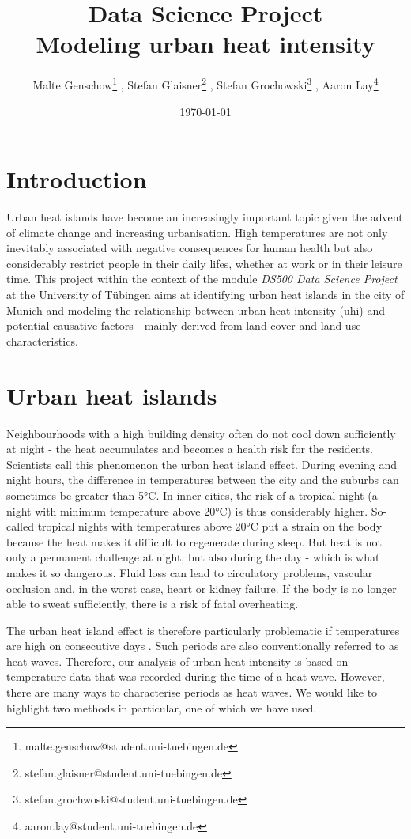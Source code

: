 \documentclass[12pt]{article}
\title{\vspace{-2cm} Data Science Project \\ Modeling urban heat intensity}
\author{Malte Genschow\thanks{malte.genschow@student.uni-tuebingen.de} , Stefan Glaisner\thanks{stefan.glaisner@student.uni-tuebingen.de} , Stefan Grochowski\thanks{stefan.grochwoski@student.uni-tuebingen.de} , Aaron Lay\thanks{aaron.lay@student.uni-tuebingen.de}}
\date{\today}
\begin{document}
\maketitle



\section{Introduction}

Urban heat islands have become an increasingly important topic given the advent of climate change and increasing urbanisation. High temperatures are not only inevitably associated with negative consequences for human health \citep{anderson2009,basu2002,basu2009} but also considerably restrict people in their daily lifes, whether at work or in their leisure time. This project within the context of the module \emph{DS500 Data Science Project} at the University of Tübingen aims at identifying urban heat islands in the city of Munich and modeling the relationship between urban heat intensity (\acrshort{uhi}) and potential causative factors - mainly derived from land cover and land use characteristics.


\section{Urban heat islands}

Neighbourhoods with a high building density often do not cool down sufficiently at night - the heat accumulates and becomes a health risk for the residents. Scientists call this phenomenon the urban heat island effect. During evening and night hours, the difference in temperatures between the city and the suburbs can sometimes be greater than 5°C. In inner cities, the risk of a tropical night (a night with minimum temperature above 20°C) is thus considerably higher. So-called tropical nights with temperatures above 20°C put a strain on the body because the heat makes it difficult to regenerate during sleep. But heat is not only a permanent challenge at night, but also during the day - which is what makes it so dangerous. Fluid loss can lead to circulatory problems, vascular occlusion and, in the worst case, heart or kidney failure. If the body is no longer able to sweat sufficiently, there is a risk of fatal overheating.

The urban heat island effect is therefore particularly problematic if temperatures are high on consecutive days \citep{gasparrini2011}. Such periods are also conventionally referred to as heat waves. Therefore, our analysis of urban heat intensity is based on temperature data that was recorded during the time of a heat wave. However, there are many ways to characterise periods as heat waves. We would like to highlight two methods in particular, one of which we have used.
\end{document}

